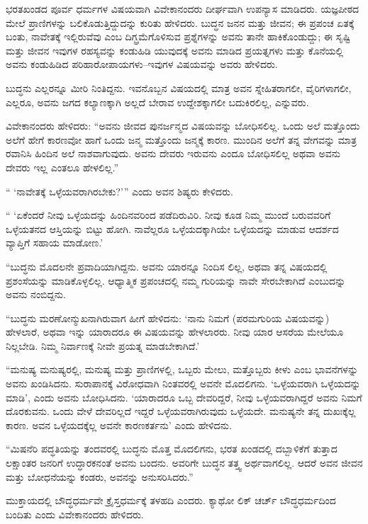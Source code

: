 ಭರತಖಂಡದ ಪೂರ್ವ ಧರ್ಮಗಳ ವಿಷಯವಾಗಿ ವಿವೇಕಾನಂದರು ದೀರ್ಘವಾಗಿ ಉಪನ್ಯಾಸ ಮಾಡಿದರು. ಯಜ್ಞಪೀಠದ ಮೇಲೆ ಪ್ರಾಣಿಗಳನ್ನು ಬಲಿಕೊಡುತ್ತಿದ್ದುದನ್ನು ಕುರಿತು ಹೇಳಿದರು. ಬುದ್ಧನ ಜನನ ಮತ್ತು ಜೀವನ; ಈ ಪ್ರಪಂಚ ಏತಕ್ಕೆ ಬಂತು, ನಾವೇತಕ್ಕೆ ಇಲ್ಲಿರುವೆವು ಎಂಬ ದಿಗ್ಭ್ರಮೆಗೊಳಿಸುವ ಪ್ರಶ್ನೆಗಳನ್ನು ಅವನು ತಾನೇ ಹಾಕಿಕೊಂಡುದ್ದು; ಈ ಸೃಷ್ಟಿ ಮತ್ತು ಜೀವನ ಇವುಗಳ ರಹಸ್ಯವನ್ನು ಕಂಡುಹಿಡಿ ಯುವುದಕ್ಕೆ ಅವನು ಮಾಡಿದ ಪ್ರಯತ್ನಗಳು ಮತ್ತು ಕೊನೆಯಲ್ಲಿ ಅವನು ಕಂಡುಹಿಡಿದ ಪರಿಹಾರೋಪಾಯಗಳು–ಇವುಗಳ ವಿಷಯವನ್ನು ಅವರು ಹೇಳಿದರು.

ಬುದ್ಧನು ಎಲ್ಲರನ್ನೂ ಮೀರಿ ನಿಂತಿದ್ದನು. ಇವನೊಬ್ಬನ ವಿಷಯದಲ್ಲಿ ಮಾತ್ರ ಅವನ ಸ್ನೇಹಿತರಾಗಲೀ, ವೈರಿಗಳಾಗಲೀ, ಎಲ್ಲರೂ, ಅವನು ಜಗದ ಕಲ್ಯಾಣಕ್ಕಾಗಿ ಅಲ್ಲದೆ ಬೇರಾವ ಉದ್ದೇಶಕ್ಕಾಗಲೀ ಬದುಕಿರಲಿಲ್ಲ, ಎನ್ನುವರು.

ವಿವೇಕಾನಂದರು ಹೇಳಿದರು: “ಅವನು ಜೀವದ ಪುನರ್ಜನ್ಮದ ವಿಷಯವನ್ನು ಬೋಧಿಸಲಿಲ್ಲ. ಒಂದು ಅಲೆ ಮತ್ತೊಂದು ಅಲೆಗೆ ಹೇಗೆ ಕಾರಣವೋ ಹಾಗೆ ಒಂದು ಜನ್ಮ ಮತ್ತೊಂದು ಜನ್ಮಕ್ಕೆ ಕಾರಣ. ಮುಂದಿನ ಅಲೆಗೆ ತನ್ನ ವೇಗವನ್ನು ಮಾತ್ರ ರವಾನಿಸಿ ಹಿಂದಿನ ಅಲೆ ನಾಶವಾಗುವುದು. ಅವನು ದೇವರು ಇರುವನು ಎಂದೂ ಬೋಧಿಸಲಿಲ್ಲ ಅಥವಾ ಅವನು ದೇವರು ಇಲ್ಲ ಎಂತಲೂ ಹೇಳಲಿಲ್ಲ.”

“ ‘ನಾವೇತಕ್ಕೆ ಒಳ್ಳೆಯವರಾಗಿರಬೇಕು?’” ಎಂದು ಅವನ ಶಿಷ್ಯರು ಕೇಳಿದರು.

“ ‘ಏಕೆಂದರೆ ನೀವು ಒಳ್ಳೆಯದನ್ನು ಹಿಂದಿನವರಿಂದ ಪಡೆದಿರುವಿರಿ. ನೀವು ಕೂಡ ನಿಮ್ಮ ಮುಂದೆ ಬರುವವರಿಗೆ ಒಳ್ಳೆಯತನದ ಆಸ್ತಿಯನ್ನು ಬಿಟ್ಟು ಹೋಗಿ. ನಾವೆಲ್ಲರೂ ಒಳ್ಳೆಯದಕ್ಕಾಗಿಯೇ ಒಳ್ಳೆಯದನ್ನು ಮಾಡುವ ಆದರ್ಶದ ವ್ಯಾಪ್ತಿಗೆ ಸಹಾಯ ಮಾಡೋಣ.’

“ಬುದ್ಧನು ಮೊದಲನೇ ಪ್ರವಾದಿಯಾಗಿದ್ದನು. ಅವನು ಯಾರನ್ನೂ ನಿಂದಿಸ ಲಿಲ್ಲ, ಅಥವಾ ತನ್ನ ವಿಷಯದಲ್ಲಿ ಪ್ರಶಂಸೆಯನ್ನು ಮಾಡಿಕೊಳ್ಳಲಿಲ್ಲ. ಆಧ್ಯಾತ್ಮಿಕ ಪ್ರಪಂಚದಲ್ಲಿ ನಮ್ಮ ಗುರಿಯನ್ನು ನಾವೇ ಸೇರಬೇಕಾಗಿದೆ ಎಂಬುದನ್ನು ಅವನು ನಂಬಿದ್ದನು.

“ಬುದ್ಧನು ಮರಣೋನ್ಮುಖನಾಗಿರುವಾಗ ಹೀಗೆ ಹೇಳಿದನು: ‘ನಾನು ನಿಮಗೆ (ಪರಮಗುರಿಯ ವಿಷಯವನ್ನು) ಹೇಳಲಾರೆ, ಅಥವಾ ಇನ್ನು ಯಾರಾದರೂ ಈ ವಿಷಯವನ್ನು ಹೇಳಲಾರರು. ನೀವು ಯಾರ ಆಸರೆಯ ಮೇಲೆಯೂ ನಿಲ್ಲಬೇಡಿ. ನಿಮ್ಮ ನಿರ್ವಾಣಕ್ಕೆ ನೀವೇ ಪ್ರಯತ್ನ ಮಾಡಬೇಕಾಗಿದೆ.’

“ಮನುಷ್ಯ ಮನುಷ್ಯರಲ್ಲಿ, ಮನುಷ್ಯ ಮತ್ತು ಪ್ರಾಣಿಗಳಲ್ಲಿ, ಒಬ್ಬರು ಮೇಲು, ಮತ್ತೊಬ್ಬರು ಕೀಳು ಎಂಬ ಭಾವನೆಗಳನ್ನು ಅವನು ಖಂಡಿಸಿದನು. ಸುರಾಪಾನಕ್ಕೆ ವಿರೋಧವಾಗಿ ನಿಂತವರಲ್ಲಿ ಅವನೇ ಮೊದಲಿಗನು. ‘ಒಳ್ಳೆಯವರಾಗಿ ಒಳ್ಳೆಯದನ್ನು ಮಾಡಿ’, ಎಂದು ಅವನು ಬೋಧಿಸಿದನು. ‘ಯಾರಾದರೂ ಒಬ್ಬ ದೇವರಿದ್ದರೆ, ನೀವು ಒಳ್ಳೆಯವರಾಗಿದ್ದರೆ ಅವನು ನಿಮಗೆ ದೊರಕುವನು. ಒಂದು ವೇಳೆ ದೇವರಿಲ್ಲದೆ ಇದ್ದರೆ ಒಳ್ಳೆಯವರಾಗಿರುವುದು ಒಳ್ಳೆಯದೇ. ಮನುಷ್ಯನೇ ತನ್ನ ದುಖಃಕ್ಕೆಲ್ಲ ಕಾರಣ. ಅವನ ಒಳ್ಳೆಯದಕ್ಕೆಲ್ಲ ಅವನೇ ಕಾರಣಕರ್ತನು’ ಎಂದು ಹೇಳಿದನು.

“ಮಿಷನೆರಿ ಪದ್ಧತಿಯನ್ನು ತಂದವರಲ್ಲಿ ಬುದ್ಧನು ಮೊತ್ತ ಮೊದಲಿಗನು, ಭರತ ಖಂಡದಲ್ಲಿ ದಬ್ಬಾಳಿಕೆಗೆ ತುತ್ತಾದ ಲಕ್ಷಾಂತರ ಜನರಿಗೆ ಉದ್ಧಾರಕನಂತೆ ಅವನು ಬಂದನು. ಅವರಿಗೇ ಬುದ್ಧನ ತತ್ತ್ವ ಅರ್ಥವಾಗಲಿಲ್ಲ. ಆದರೆ ಅವನ ಜೀವನ ಮತ್ತು ಬೋಧನೆಯನ್ನು ಕಂಡರು, ಅವನನ್ನು ಅನುಸರಿಸಿದರು.”

ಮುಕ್ತಾಯದಲ್ಲಿ ಬೌದ್ಧಧರ್ಮವೇ ಕ್ರೈಸ್ತಧರ್ಮಕ್ಕೆ ತಳಹದಿ ಎಂದರು. ಕ್ಯಾಥೋ ಲಿಕ್​ ಚರ್ಚ್​ ಬೌದ್ಧಧರ್ಮದಿಂದ ಬಂದಿತು ಎಂದು ವಿವೇಕಾನಂದರು ಹೇಳಿದರು.

